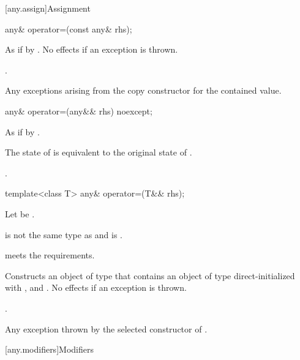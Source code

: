 [any.assign]{Assignment}

%
\begin{itemdecl}
any& operator=(const any& rhs);
\end{itemdecl}

\begin{itemdescr}
\pnum
\effects
As if by .
No effects if an exception is thrown.

\pnum
\returns
{}.

\pnum
\throws
Any exceptions arising from the copy constructor for the contained value.
\end{itemdescr}

%
\begin{itemdecl}
any& operator=(any&& rhs) noexcept;
\end{itemdecl}

\begin{itemdescr}
\pnum
\effects
As if by .

\pnum
\ensures
The state of  is equivalent to the original state of .

\pnum
\returns
{}.
\end{itemdescr}

%
\begin{itemdecl}
template<class T>
  any& operator=(T&& rhs);
\end{itemdecl}

\begin{itemdescr}
\pnum
Let  be .

\pnum
\constraints
{} is not the same type as  and
 is .

\pnum
\expects
{} meets the  requirements.

\pnum
\effects
Constructs an object  of type  that contains an object of type  direct-initialized with , and .
No effects if an exception is thrown.

\pnum
\returns
{}.

\pnum
\throws
Any exception thrown by the selected constructor of .
\end{itemdescr}

[any.modifiers]{Modifiers}

